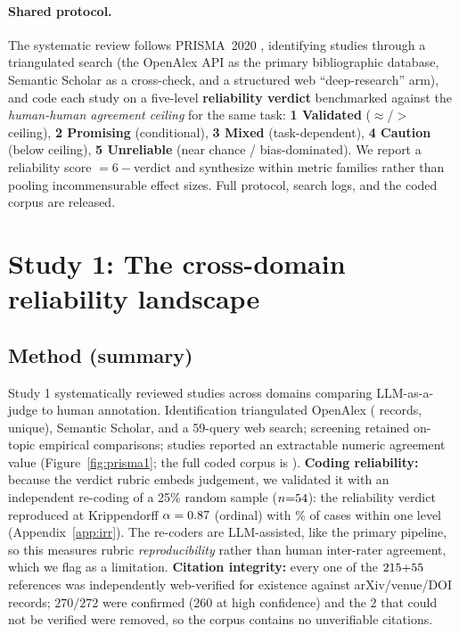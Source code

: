 \paragraph{Shared protocol.} The systematic review follows PRISMA~2020 \citep{page2021prisma}, identifying studies through a
triangulated search (the OpenAlex API as the primary bibliographic database, Semantic Scholar as a cross-check, and
a structured web ``deep-research'' arm), and code each study on a five-level \textbf{reliability verdict}
benchmarked against the \emph{human-human agreement ceiling} for the same task: \textbf{1 Validated}
($\approx$/$>$ ceiling), \textbf{2 Promising} (conditional), \textbf{3 Mixed} (task-dependent), \textbf{4 Caution}
(below ceiling), \textbf{5 Unreliable} (near chance / bias-dominated). We report a reliability score $=6-$verdict
and synthesize within metric families rather than pooling incommensurable effect sizes. Full protocol, search logs, and the coded corpus are released.

\section{Study 1: The cross-domain reliability landscape}
\subsection{Method (summary)}
Study 1 systematically reviewed \Nstudies{} studies across \Ndomains{} domains comparing LLM-as-a-judge to human
annotation. Identification triangulated OpenAlex (\OAretrieved{} records, \OAunique{} unique), Semantic Scholar, and
a 59-query web search; screening retained on-topic empirical comparisons; \Nnumeric{} studies reported an
extractable numeric agreement value (Figure~\ref{fig:prisma1}; the full coded corpus is \corpustabref).
\textbf{Coding reliability:} because the verdict rubric embeds judgement, we validated it with an independent
re-coding of a 25\% random sample ($n{=}54$): the reliability verdict reproduced at Krippendorff
$\alpha=0.87$ (ordinal) with \IRRsoneWone\% of cases within one level (Appendix~\ref{app:irr}). The re-coders are
LLM-assisted, like the primary pipeline, so this measures rubric \emph{reproducibility} rather than human
inter-rater agreement, which we flag as a limitation. \textbf{Citation integrity:} every one of the
$215{+}55$ references was independently web-verified for existence against arXiv/venue/DOI records;
$270/272$ were confirmed (260 at high confidence) and the $2$ that could not be verified were removed, so the
corpus contains no unverifiable citations.

